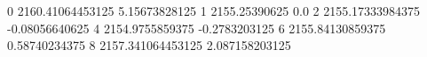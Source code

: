 0 2160.41064453125 5.15673828125
1 2155.25390625 0.0
2 2155.17333984375 -0.08056640625
4 2154.9755859375 -0.2783203125
6 2155.84130859375 0.58740234375
8 2157.341064453125 2.087158203125
